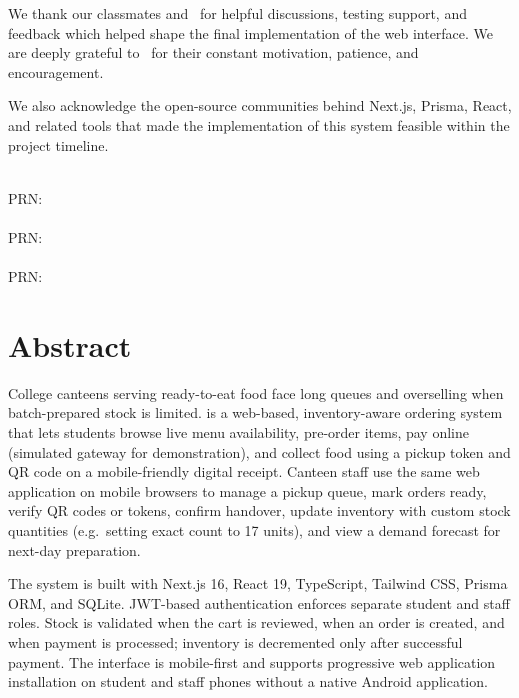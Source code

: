 We thank our classmates and \AckFriends\ for helpful discussions, testing support, and feedback which helped shape the final implementation of the web interface. We are deeply grateful to \AckFamily\ for their constant motivation, patience, and encouragement.

We also acknowledge the open-source communities behind Next.js, Prisma, React, and related tools that made the implementation of this system feasible within the project timeline.

\vspace*{1.5cm}
\begin{flushright}
  \hspace*{-2cm}\textbf{\StudentName}\\
  \hspace*{-2cm}PRN: \RollNo\\[0.2cm]
  \hspace*{-2cm}\textbf{\StudentTwoName}\\
  \hspace*{-2cm}PRN: \StudentTwoRoll\\[0.2cm]
  \hspace*{-2cm}\textbf{\StudentThreeName}\\
  \hspace*{-2cm}PRN: \StudentThreeRoll
\end{flushright}

\newpage
\chapter*{Abstract}
\thispagestyle{plain}
\noindent
College canteens serving ready-to-eat food face long queues and overselling when batch-prepared stock is limited. {\bfseries \ShortTitle{}} is a web-based, inventory-aware ordering system that lets students browse live menu availability, pre-order items, pay online (simulated gateway for demonstration), and collect food using a pickup token and QR code on a mobile-friendly digital receipt. Canteen staff use the same web application on mobile browsers to manage a pickup queue, mark orders ready, verify QR codes or tokens, confirm handover, update inventory with custom stock quantities (e.g.\ setting exact count to 17 units), and view a demand forecast for next-day preparation.

\vspace{15pt}

\noindent
The system is built with Next.js 16, React 19, TypeScript, Tailwind CSS, Prisma ORM, and SQLite. JWT-based authentication enforces separate student and staff roles. Stock is validated when the cart is reviewed, when an order is created, and when payment is processed; inventory is decremented only after successful payment. The interface is mobile-first and supports progressive web application installation on student and staff phones without a native Android application.

